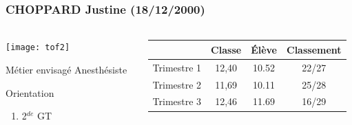 \documentclass{beamer}
\begin{document}
\begin{frame}
	\frametitle{CHOPPARD Justine (18/12/2000)}  
	\framesubtitle{ }	
	
	
	\begin{columns}[onlytextwidth]
		
		
		
		\begin{column}{0.3\textwidth}
			\vspace*{-.5cm}
			\begin{center}
				\texttt{[image: tof2]}
			\end{center}
			
			
			{\small \begin{block}{Métier envisagé}
					Anesthésiste
				\end{block}
				
				\begin{alertblock}{Orientation}
					\begin{enumerate}
						\item 2$^{de}$ GT
						
					\end{enumerate}
				\end{alertblock}}
				
				
			\end{column}	
			
			\begin{column}{0.70\textwidth}
				
				\begin{center}
					
					\vspace*{-.7cm}	
					
					{\small 
						\colorbox{pastelgray}{
						\begin{tabular}{c|c|c|c}
							& {\color{red} Classe}                       & {\color{blue}\'Elève}                      & {\color{mygreen} Classement}                   \\ \hline
							Trimestre 1 & {\color{red} 12,40} & {\color{blue} 10.52} & {\color{mygreen} 22/27} \\ \hline
							Trimestre 2 & {\color{red} 11,69} & {\color{blue} 10.11} & {\color{mygreen} 25/28} \\ \hline
							Trimestre 3 & {\color{red} 12,46} & {\color{blue} 11.69} & {\color{mygreen} 16/29}
						\end{tabular}}
						}
						
						
						
						\vspace*{-1cm}
						

\end{center}
\end{column}
\end{columns}
\end{frame}
\end{document}
